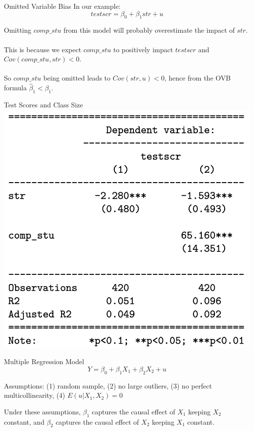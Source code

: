 \documentclass{./../div_teaching_slides}
\begin{document}
\begin{frame}{Omitted Variable Bias}
In our example:
$$ testscr = \beta_0 + \beta_1 str + u $$	
\vspace{0.1em}

Omitting $comp\_stu$ from this model will probably overestimate the impact of $str$. \\~\\

This is because we expect $comp\_stu$ to positively impact $testscr$ and $Cov(comp\_stu, str)<0$. \\~\\
So $comp\_stu$ being omitted leads to $Cov(str,u)<0$, hence from the OVB formula $\hat{\beta}_1<\beta_1$.
\end{frame}

\begin{frame}{Test Scores and Class Size}
\vspace{-0.5em}
\centering
\includegraphics[scale=0.3]{reg_output_stargazer2.png}
\end{frame}


\begin{frame}{Multiple Regression Model}
$$ Y = \beta_0 + \beta_1 X_{1} + \beta_2 X_{2} + u  $$ 
\begin{witemize}
  \item Assumptions: (1) random sample, (2) no large outliers, (3) no perfect multicollinearity, (4) $E(u | X_1, X_2)=0$
  \item Under these assumptions, $\beta_1$ captures the causal effect of $X_1$ keeping $X_2$ constant, and $\beta_2$ captures the causal effect of $X_2$ keeping $X_1$ constant. 
\end{witemize}
\end{frame}
\end{document}
